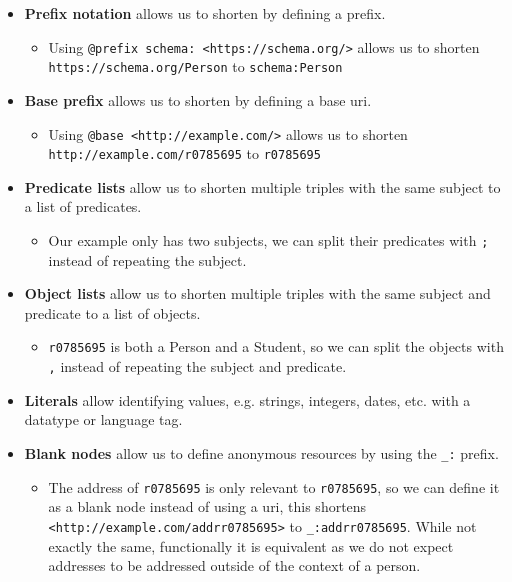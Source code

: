 \begin{itemize}
    \item \textbf{Prefix notation} allows us to shorten  by defining a prefix.
    \begin{itemize}
        \item Using \texttt{@prefix schema: <https://schema.org/>} allows us to shorten \break\texttt{https://schema.org/Person} to \texttt{schema:Person}
    \end{itemize}
    \item \textbf{Base prefix} allows us to shorten  by defining a base \acrshort{uri}.
    \begin{itemize}
        \item Using \texttt{@base <http://example.com/>} allows us to shorten \break\texttt{http://example.com/r0785695} to \texttt{r0785695}
    \end{itemize}
    \item \textbf{Predicate lists} allow us to shorten multiple triples with the same subject to a list of predicates.
    \begin{itemize}
        \item Our example only has two subjects, we can split their predicates with \texttt{;} instead of repeating the subject.
    \end{itemize}
    \item \textbf{Object lists} allow us to shorten multiple triples with the same subject and predicate to a list of objects.
    \begin{itemize}
        \item \texttt{r0785695} is both a Person and a Student, so we can split the objects with \texttt{,} instead of repeating the subject and predicate.
    \end{itemize}
    \item \textbf{Literals} allow identifying values, e.g. strings, integers, dates, etc. with a datatype or language tag.
    \item \textbf{Blank nodes} allow us to define anonymous resources by using the \texttt{\_:} prefix.
    \begin{itemize}
        \item The address of \texttt{r0785695} is only relevant to \texttt{r0785695}, so we can define it as a blank node instead of using a \acrshort{uri}, this shortens \texttt{<http://example.com/addrr0785695>} to \texttt{\_:addrr0785695}. While not exactly the same, functionally it is equivalent as we do not expect addresses to be addressed outside of the context of a person.  

\end{itemize}
\end{itemize}
